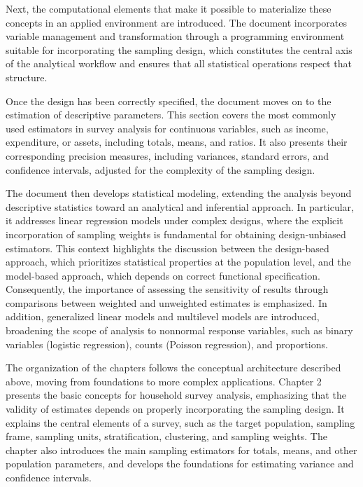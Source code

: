 \documentclass[
  english,
  12pt,
]{book}
\begin{document}
Next, the computational elements that make it possible to materialize these concepts in an applied environment are introduced. The document incorporates variable management and transformation through a programming environment suitable for incorporating the sampling design, which constitutes the central axis of the analytical workflow and ensures that all statistical operations respect that structure.

Once the design has been correctly specified, the document moves on to the estimation of descriptive parameters. This section covers the most commonly used estimators in survey analysis for continuous variables, such as income, expenditure, or assets, including totals, means, and ratios. It also presents their corresponding precision measures, including variances, standard errors, and confidence intervals, adjusted for the complexity of the sampling design.

The document then develops statistical modeling, extending the analysis beyond descriptive statistics toward an analytical and inferential approach. In particular, it addresses linear regression models under complex designs, where the explicit incorporation of sampling weights is fundamental for obtaining design-unbiased estimators. This context highlights the discussion between the design-based approach, which prioritizes statistical properties at the population level, and the model-based approach, which depends on correct functional specification. Consequently, the importance of assessing the sensitivity of results through comparisons between weighted and unweighted estimates is emphasized. In addition, generalized linear models and multilevel models are introduced, broadening the scope of analysis to nonnormal response variables, such as binary variables (logistic regression), counts (Poisson regression), and proportions.

The organization of the chapters follows the conceptual architecture described above, moving from foundations to more complex applications. Chapter 2 presents the basic concepts for household survey analysis, emphasizing that the validity of estimates depends on properly incorporating the sampling design. It explains the central elements of a survey, such as the target population, sampling frame, sampling units, stratification, clustering, and sampling weights. The chapter also introduces the main sampling estimators for totals, means, and other population parameters, and develops the foundations for estimating variance and confidence intervals.
\end{document}
